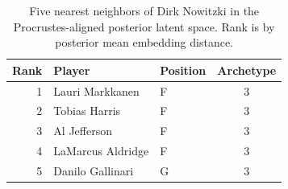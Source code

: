 \begin{table}[htbp]
  \centering\small
  \begin{tabular}{rllc}
    \toprule
    Rank & Player & Position & Archetype \\
    \midrule
    1 & Lauri Markkanen & F & 3 \\
    2 & Tobias Harris & F & 3 \\
    3 & Al Jefferson & F & 3 \\
    4 & LaMarcus Aldridge & F & 3 \\
    5 & Danilo Gallinari & G & 3 \\
    \bottomrule
  \end{tabular}
  \caption{Five nearest neighbors of Dirk Nowitzki in the Procrustes-aligned posterior latent space. Rank is by posterior mean embedding distance.}
  \label{tab:Dirk_Nowitzki_neighbors}
\end{table}

